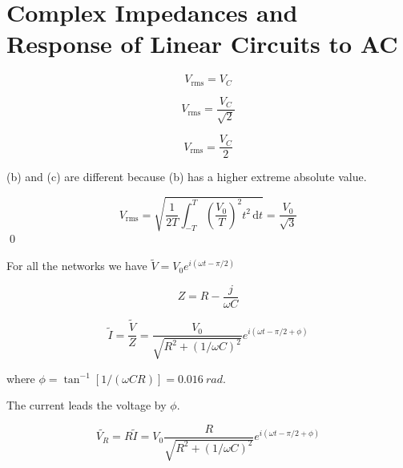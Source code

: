 \documentclass[12pt]{article}
\begin{document}



\pagebreak
\section*{Complex Impedances and Response of Linear Circuits to AC}




\begin{equation}
    V_{\text{rms}} = V_{C}
\end{equation}


\begin{equation}
    V_{\text{rms}} = \frac{V_{C}}{\sqrt{2}}
\end{equation}


\begin{equation}
    V_{\text{rms}} = \frac{V_{C}}{2}
\end{equation}

(b) and (c) are different because (b) has a higher extreme absolute value.


\begin{equation}
    V_{\text{rms}} = \sqrt{\frac{1}{2T} \int_{-T}^{T} \left( \frac{V_{0}}{T} \right)^{2} t^{2} \, \mathrm{d}t} = \frac{V_{0}}{\sqrt{3}}
\end{equation}
\qed


For all the networks we have $\tilde{V} = V_{0} e^{i(\omega t - \pi/2)}$


\begin{equation}
    Z = R - \frac{j}{\omega C}
\end{equation}

\begin{equation}
    \tilde{I} = \frac{\tilde{V}}{Z} = \frac{V_{0}}{\sqrt{R^{2} + (1/\omega C)^{2}}} e^{i(\omega t - \pi/2 + \phi)}
\end{equation}

where $\phi = \tan^{-1}{\left[ 1/(\omega C R) \right]} = \qty{0.016}{rad}$.

The current leads the voltage by $\phi$.

\begin{equation}
    \tilde{V_{R}} = R \tilde{I} = V_{0} \frac{R}{\sqrt{R^{2} + (1/\omega C)^{2}}} e^{i(\omega t - \pi/2 + \phi)}
\end{equation}
\end{document}

